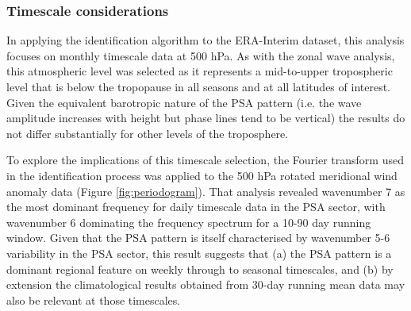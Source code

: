 \subsubsection{Timescale considerations}

In applying the identification algorithm to the ERA-Interim dataset, this analysis focuses on monthly timescale data at 500 hPa. As with the zonal wave analysis, this atmospheric level was selected as it represents a mid-to-upper tropospheric level that is below the tropopause in all seasons and at all latitudes of interest. Given the equivalent barotropic nature of the PSA pattern (i.e. the wave amplitude increases with height but phase lines tend to be vertical) the results do not differ substantially for other levels of the troposphere. 

To explore the implications of this timescale selection, the Fourier transform used in the identification process was applied to the 500 hPa rotated meridional wind anomaly data (Figure \ref{fig:periodogram}). That analysis revealed wavenumber 7 as the most dominant frequency for daily timescale data in the PSA sector, with wavenumber 6 dominating the frequency spectrum for a 10-90 day running window. Given that the PSA pattern is itself characterised by wavenumber 5-6 variability in the PSA sector, this result suggests that (a) the PSA pattern is a dominant regional feature on weekly through to seasonal timescales, and (b) by extension the climatological results obtained from 30-day running mean data may also be relevant at those timescales.

